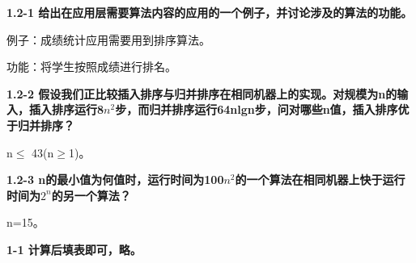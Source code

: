 \documentclass[
]{article}
\author{}
\date{}
\begin{document}
\textbf{1.2-1
给出在应用层需要算法内容的应用的一个例子，并讨论涉及的算法的功能。}

例子：成绩统计应用需要用到排序算法。

功能：将学生按照成绩进行排名。

\textbf{1.2-2
假设我们正比较插入排序与归并排序在相同机器上的实现。对规模为n的输入，插入排序运行8\(n^2\)步，而归并排序运行64nlgn步，问对哪些n值，插入排序优于归并排序？}

n\(\leq\) 43(n\(\geq\)1)。

\textbf{1.2-3
n的最小值为何值时，运行时间为100\(n^2\)的一个算法在相同机器上快于运行时间为\(2^n\)的另一个算法？}

n=15。

\textbf{1-1 计算后填表即可，略。}
\end{document}
